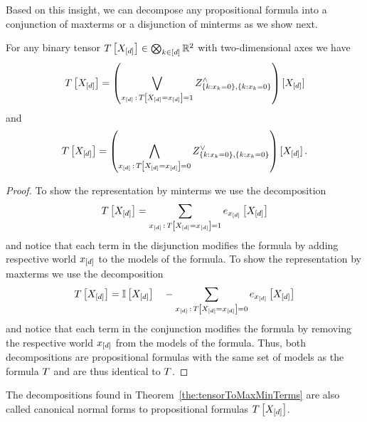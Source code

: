 Based on this insight, we can decompose any propositional formula into a conjunction of maxterms or a disjunction of minterms as we show next.

\begin{theorem}\label{the:tensorToMaxMinTerms}
	For any binary tensor $T\left[X_{[d]}\right]\in\bigotimes_{k\in[d]}\mathbb{R}^2$ with two-dimensional axes we have
	\begin{align*}
		T\left[X_{[d]}\right] = \left( \bigvee_{x_{[d]} \, : \, T\left[X_{[d]}=x_{[d]}\right] = 1} 
		Z^{\land}_{\{k : x_{k}=0\},\{k : x_{k}=0\}} 
		\right)
		[X_{[d]}] 
	\end{align*}
	and
	\begin{align*}
		T\left[X_{[d]}\right] = \left( \bigwedge_{x_{[d]} \, : \, T\left[X_{[d]}=x_{[d]}\right] = 0} 
		Z^{\lor}_{\{k : x_{k}=0\},\{k : x_{k}=0\}} 
		\right)
		[X_{[d]}] \, .
	\end{align*}
\end{theorem}
\begin{proof}
	To show the representation by minterms we use the decomposition
	\begin{align*}
		T\left[X_{[d]}\right]  = \sum_{x_{[d]} \, : \, T\left[X_{[d]}=x_{[d]}\right] = 1} e_{x_{[d]}}\left[X_{[d]}\right]
	\end{align*}
	and notice that each term in the disjunction modifies the formula by adding respective world $x_{[d]}$ to the models of the formula.
	To show the representation by maxterms we use the decomposition
	\begin{align*}
		T\left[X_{[d]}\right]  = \mathbb{I}\left[X_{[d]}\right] \quad - \sum_{x_{[d]} \, : \, T\left[X_{[d]}=x_{[d]}\right] = 0} e_{x_{[d]}}\left[X_{[d]}\right]
	\end{align*}
	and notice that each term in the conjunction modifies the formula by removing the respective world $x_{[d]}$ from the models of the formula.	
	Thus, both decompositions are propositional formulas with the same set of models as the formula $T$ and are thus identical to $T$.
\end{proof}


The decompositions found in Theorem~\ref{the:tensorToMaxMinTerms} are also called canonical normal forms to propositional formulas $T\left[X_{[d]}\right]$.

